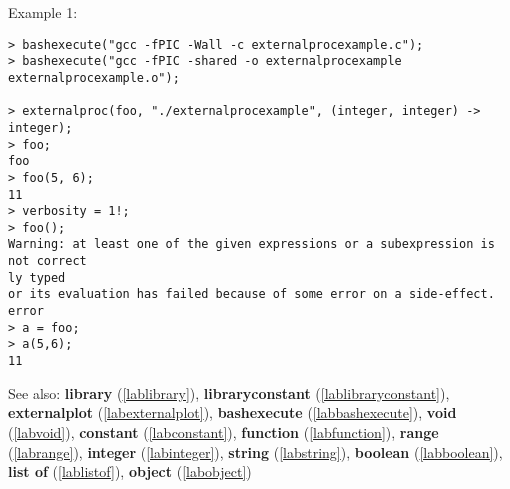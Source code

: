 \noindent Example 1: 
\begin{center}\begin{minipage}{15cm}\begin{Verbatim}[frame=single]
> bashexecute("gcc -fPIC -Wall -c externalprocexample.c");
> bashexecute("gcc -fPIC -shared -o externalprocexample externalprocexample.o");

> externalproc(foo, "./externalprocexample", (integer, integer) -> integer);
> foo;
foo
> foo(5, 6);
11
> verbosity = 1!;
> foo();
Warning: at least one of the given expressions or a subexpression is not correct
ly typed
or its evaluation has failed because of some error on a side-effect.
error
> a = foo;
> a(5,6);
11
\end{Verbatim}
\end{minipage}\end{center}
See also: \textbf{library} (\ref{lablibrary}), \textbf{libraryconstant} (\ref{lablibraryconstant}), \textbf{externalplot} (\ref{labexternalplot}), \textbf{bashexecute} (\ref{labbashexecute}), \textbf{void} (\ref{labvoid}), \textbf{constant} (\ref{labconstant}), \textbf{function} (\ref{labfunction}), \textbf{range} (\ref{labrange}), \textbf{integer} (\ref{labinteger}), \textbf{string} (\ref{labstring}), \textbf{boolean} (\ref{labboolean}), \textbf{list of} (\ref{lablistof}), \textbf{object} (\ref{labobject})
